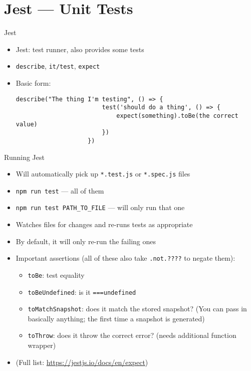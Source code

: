 \documentclass[t]{beamer}
\begin{document}
	\section{Jest --- Unit Tests}
	\begin{frame}[fragile]{Jest}
		\begin{itemize}
			\item Jest: test runner, also provides some tests
			\item \texttt{describe}, \texttt{it/test}, \texttt{expect}
			\item Basic form:
				\begin{lstlisting}[autogobble]
					describe("The thing I'm testing", () => {
						test('should do a thing', () => {
							expect(something).toBe(the correct value)
						})
					})
				\end{lstlisting}
		\end{itemize}
	\end{frame}

	\begin{frame}[fragile]{Running Jest}
		\begin{itemize}
			\item Will automatically pick up \texttt{*.test.js} or \texttt{*.spec.js} files
			\item \texttt{npm run test} --- all of them
			\item \texttt{npm run test PATH\_TO\_FILE} --- will only run that one
			\item Watches files for changes and re-runs tests as appropriate
			\item By default, it will only re-run the failing ones
			\item Important assertions (all of these also take \texttt{.not.????} to negate them):
				\begin{itemize}
					\item \texttt{toBe}: test equality
					\item \texttt{toBeUndefined}: is it \texttt{===undefined}
					\item \texttt{toMatchSnapshot}: does it match the stored snapshot? (You can pass in basically anything; the first time a snapshot is generated)
					\item \texttt{toThrow}: does it throw the correct error? (needs additional function wrapper)
				\end{itemize}
			\item (Full list: \url{https://jestjs.io/docs/en/expect})
		\end{itemize}
	\end{frame}
\end{document}
